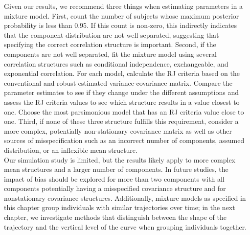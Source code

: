 Given our results, we recommend three things when estimating parameters in a mixture model. First, count the number of subjects whose maximum posterior probability is less than 0.95. If this count is non-zero, this indirectly indicates that the component distribution are not well separated, suggesting that specifying the correct correlation structure is important. Second, if the components are not well separated, fit the mixture model using several correlation structures such as conditional independence, exchangeable, and exponential correlation. For each model, calculate the RJ criteria based on the conventional and robust estimated variance-covariance matrix.  Compare the parameter estimates to see if they change under the different assumptions and assess the RJ criteria values to see which structure results in a value closest to one. Choose the most parsimonious model that has an RJ criteria value close to one.  Third, if none of these three structure fulfills this requirement, consider a more complex, potentially non-stationary covariance matrix as well as other sources of misspecification such as an incorrect number of components, assumed distribution, or an inflexible mean structure.\\

Our simulation study is limited, but the results likely apply to more complex mean structures and a larger number of components. In future studies, the impact of bias should be explored for more than two components with all components potentially having a misspecified covariance structure and for nonstationary covariance structures. Additionally, mixture models as specified in this chapter group individuals with similar trajectories over time; in the next chapter, we investigate methods that distinguish between the shape of the trajectory and the vertical level of the curve when grouping individuals together.


